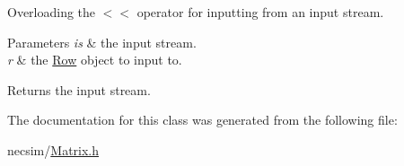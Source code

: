 Overloading the $<$$<$ operator for inputting from an input stream. 


\begin{DoxyParams}{Parameters}
{\em is} & the input stream. \\
\hline
{\em r} & the \hyperlink{class_row}{Row} object to input to. \\
\hline
\end{DoxyParams}
\begin{DoxyReturn}{Returns}
the input stream. 
\end{DoxyReturn}


The documentation for this class was generated from the following file\+:\begin{DoxyCompactItemize}
\item 
necsim/\hyperlink{_matrix_8h}{Matrix.\+h}\end{DoxyCompactItemize}

